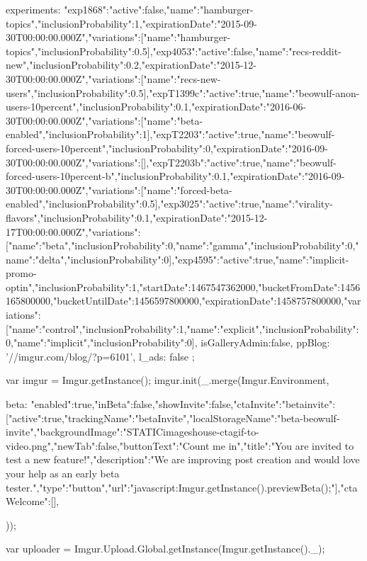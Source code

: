 {{{                experiments:   {"exp1868":{"active":false,"name":"hamburger-topics","inclusionProbability":1,"expirationDate":"2015-09-30T00:00:00.000Z","variations":[{"name":"hamburger-topics","inclusionProbability":0.5}]},"exp4053":{"active":false,"name":"recs-reddit-new","inclusionProbability":0.2,"expirationDate":"2015-12-30T00:00:00.000Z","variations":[{"name":"recs-new-users","inclusionProbability":0.5}]},"expT1399c":{"active":true,"name":"beowulf-anon-users-10percent","inclusionProbability":0.1,"expirationDate":"2016-06-30T00:00:00.000Z","variations":[{"name":"beta-enabled","inclusionProbability":1}]},"expT2203":{"active":true,"name":"beowulf-forced-users-10percent","inclusionProbability":0,"expirationDate":"2016-09-30T00:00:00.000Z","variations":[]},"expT2203b":{"active":true,"name":"beowulf-forced-users-10percent-b","inclusionProbability":0.1,"expirationDate":"2016-09-30T00:00:00.000Z","variations":[{"name":"forced-beta-enabled","inclusionProbability":0.5}]},"exp3025":{"active":true,"name":"virality-flavors","inclusionProbability":0.1,"expirationDate":"2015-12-17T00:00:00.000Z","variations":[{"name":"beta","inclusionProbability":0},{"name":"gamma","inclusionProbability":0},{"name":"delta","inclusionProbability":0}]},"exp4595":{"active":true,"name":"implicit-promo-optin","inclusionProbability":1,"startDate":1467547362000,"bucketFromDate":1456165800000,"bucketUntilDate":1456597800000,"expirationDate":1458757800000,"variations":[{"name":"control","inclusionProbability":1},{"name":"explicit","inclusionProbability":0},{"name":"implicit","inclusionProbability":0}]}},
                isGalleryAdmin:false,
                ppBlog: '//imgur.com/blog/?p=6101',
                l_ads: false
            };

            var imgur = Imgur.getInstance();
            imgur.init(_.merge(Imgur.Environment, {
                
                
                beta: {"enabled":true,"inBeta":false,"showInvite":false,"ctaInvite":{"betainvite":[{"active":true,"trackingName":"betaInvite","localStorageName":"beta-beowulf-invite","backgroundImage":"{STATIC}\/images\/house-cta\/gif-to-video.png","newTab":false,"buttonText":"Count me in","title":"You are invited to test a new feature!","description":"We are improving post creation and would love your help as an early beta tester.","type":"button","url":"javascript:Imgur.getInstance().previewBeta();"}]},"ctaWelcome":[]},
            }));

                            var uploader = Imgur.Upload.Global.getInstance(Imgur.getInstance()._);

}}

